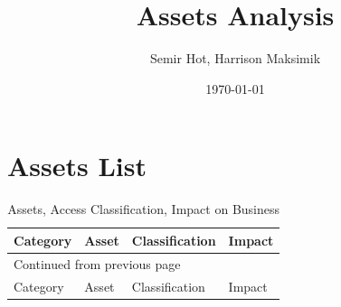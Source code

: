 \documentclass[11pt]{article}
\author{Semir Hot, Harrison Maksimik}
\date{\today}
\title{Assets Analysis}
\begin{document}
\maketitle
\tableofcontents

\section{Assets List}
\label{sec:orge0ba9c4}
\begin{longtable}{llll}
\caption{Assets, Access Classification, Impact on Business}
\\[0pt]
Category & Asset & Classification & Impact\\[0pt]
\hline
\endfirsthead
\multicolumn{4}{l}{Continued from previous page} \\[0pt]
\hline

Category & Asset & Classification & Impact \\[0pt]


\end{longtable}
\end{document}

